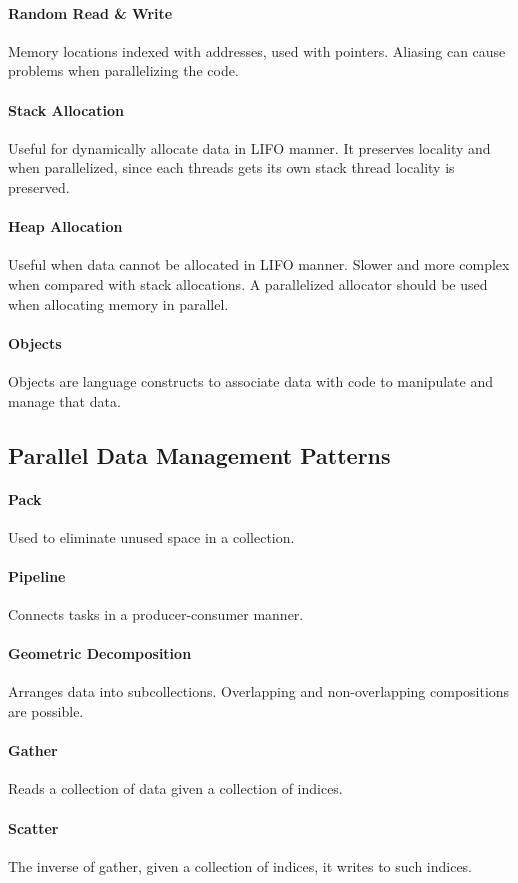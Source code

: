 \paragraph{Random Read \& Write}
Memory locations indexed with addresses, used with pointers.
Aliasing can cause problems when parallelizing the code.

\paragraph{Stack Allocation}
Useful for dynamically allocate data in LIFO manner.
It preserves locality and when parallelized, since each threads gets its own stack thread locality is preserved.

\paragraph{Heap Allocation}
Useful when data cannot be allocated in LIFO manner.
Slower and more complex when compared with stack allocations.
A parallelized allocator should be used when allocating memory in parallel.

\paragraph{Objects}
Objects are language constructs to associate data with code to manipulate and manage that data.

\subsection{Parallel Data Management Patterns}

\paragraph{Pack}
Used to eliminate unused space in a collection.

\paragraph{Pipeline}
Connects tasks in a producer-consumer manner.

\paragraph{Geometric Decomposition}
Arranges data into subcollections.
Overlapping and non-overlapping compositions are possible.

\paragraph{Gather}
Reads a collection of data given a collection of indices.

\paragraph{Scatter}
The inverse of gather, given a collection of indices, it writes to such indices.